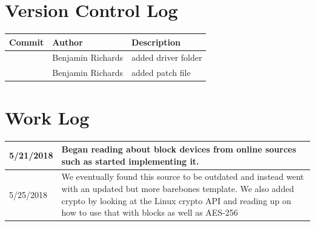 \documentclass[onecolumn,draftclsnofoot, 10pt, compsoc]{IEEEtran}
\begin{document}
	
	\section{Version Control Log}
	\begin{tabular}{|p{5cm}|p{5cm}|p{5cm}|}
		\hline
		\textbf{Commit} & \textbf{Author} & \textbf{Description}\\
		\hline
		\textcolor{blue}{\underline{\href[pdfnewwindow=true]{https://github.com/AustinRow1/OperatingSystems2/commit/7b736f88d63c1a131b084a9af25725df5d6ef8b8}{7b736f8}}} & Benjamin Richards & added driver folder\\\hline
		\textcolor{blue}{\underline{\href[pdfnewwindow=true]{https://github.com/AustinRow1/OperatingSystems2/commit/f57302faed8da1904a9248999f70fb19c9d19ad6}{f57302f}}} & Benjamin Richards & added patch file\\\hline\end{tabular}
	
	
	
	
	\section{Work Log}
	\begin{center}
		\begin{tabular}{ |p{2cm}|p{12cm}| }
			\hline
			5/21/2018 & Began reading about block devices from online sources such as \cite{block-drivers} started implementing it. 
			\\ \hline
			5/25/2018 & We eventually found this source to be outdated and instead went with an updated but more barebones template\cite{driver-template}. We also added crypto by looking at the Linux crypto API\cite{crypto-api} and reading up on how to use that with blocks\cite{block-crypto} as well as AES-256\cite{AES-256}\\
			\hline
		\end{tabular}
	\end{center}
	
	
	\bibdata{}
	
	
	
\end{document}
